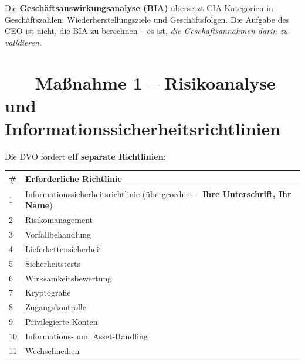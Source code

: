 \documentclass[11pt,a4paper,twoside]{book}
\newcommand{\lessontag}[1]{%
  \texorpdfstring{%
    \setlength{\fboxsep}{3pt}\colorbox{nisd2blue}{\textcolor{white}{\footnotesize\bfseries #1}}\quad%
  }{Lektion #1\ }%
}
\begin{document}
\begin{center}
\end{center}

Die \textbf{Geschäftsauswirkungsanalyse (BIA)} übersetzt CIA-Kategorien in Geschäftszahlen: Wiederherstellungsziele und Geschäftsfolgen. Die Aufgabe des CEO ist nicht, die BIA zu berechnen -- es ist, \emph{die Geschäftsannahmen darin zu validieren}.

\section{\lessontag{2.6}Maßnahme 1 -- Risikoanalyse und Informationssicherheitsrichtlinien}

Die DVO fordert \textbf{elf separate Richtlinien}:

\begin{center}
\begin{tabular}{@{}ll@{}}
\toprule
\textbf{\#} & \textbf{Erforderliche Richtlinie} \\
\midrule
1 & Informationssicherheitsrichtlinie (übergeordnet -- \textbf{Ihre Unterschrift, Ihr Name}) \\
2 & Risikomanagement \\
3 & Vorfallbehandlung \\
4 & Lieferkettensicherheit \\
5 & Sicherheitstests \\
6 & Wirksamkeitsbewertung \\
7 & Kryptografie \\
8 & Zugangskontrolle \\
9 & Privilegierte Konten \\
10 & Informations- und Asset-Handling \\
11 & Wechselmedien \\
\bottomrule
\end{tabular}
\end{center}
\end{document}
